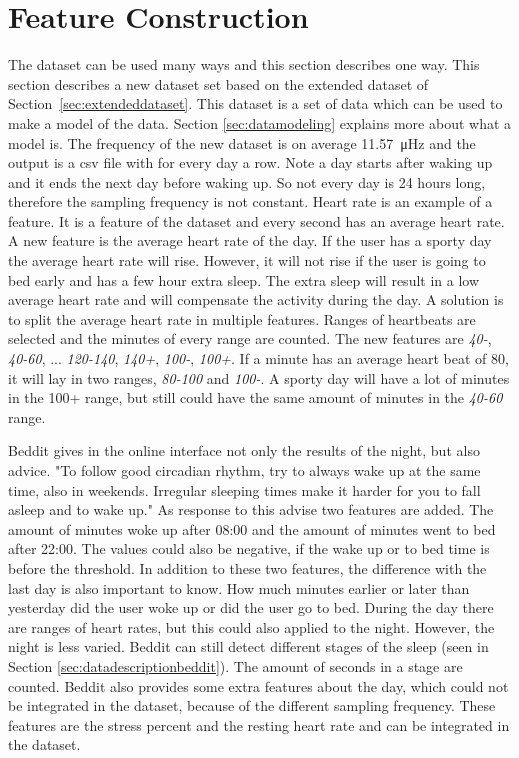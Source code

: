 	\section{Feature Construction}
		\label{sec:feature}
				The dataset can be used many ways and this section describes one way. This section describes a new dataset set based on the extended dataset of Section~\ref{sec:extendeddataset}. This dataset is a set of data which can be used to make a model of the data. Section \ref{sec:datamodeling} explains more about what a model is. The frequency of the new dataset is on average \SI{11.57}{\micro\hertz} and the output is a csv file with for every day a row. Note a day starts after waking up and it ends the next day before waking up. So not every day is 24 hours long, therefore the sampling frequency is not constant. Heart rate is an example of a feature. It is a feature of the dataset and every second has an average heart rate. A new feature is the average heart rate of the day. If the user has a sporty day the average heart rate will rise. However, it will not rise if the user is going to bed early and has a few hour extra sleep. The extra sleep will result in a low average heart rate and will compensate the activity during the day. A solution is to split the average heart rate in multiple features. Ranges of heartbeats are selected and the minutes of every range are counted. The new features are \emph{40-}, \emph{40-60}, ... \emph{120-140}, \emph{140+}, \emph{100-}, \emph{100+}. If a minute has an average heart beat of 80, it will lay in two ranges, \emph{80-100} and \emph{100-}. A sporty day will have a lot of minutes in the 100+ range, but still could have the same amount of minutes in the \emph{40-60} range. 

			Beddit gives in the online interface not only the results of the night, but also advice. "To follow good circadian rhythm, try to always wake up at the same time, also in weekends. Irregular sleeping times make it harder for you to fall asleep and to wake up." As response to this advise two features are added. The amount of minutes woke up after 08:00 and the amount of minutes went to bed after 22:00. The values could also be negative, if the wake up or to bed time is before the threshold. In addition to these two features, the difference with the last day is also important to know. How much minutes earlier or later than yesterday did the user woke up or did the user go to bed. 
			During the day there are ranges of heart rates, but this could also applied to the night. However, the night is less varied. Beddit can still detect different stages of the sleep (seen in Section \ref{sec:datadescriptionbeddit}). The amount of seconds in a stage are counted.
			 Beddit also provides some extra features about the day, which could not be integrated in the dataset, because of the different sampling frequency. These features are the stress percent and the resting heart rate and can be integrated in the dataset.
				
